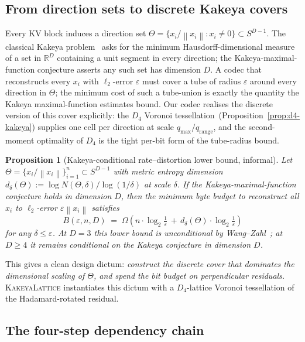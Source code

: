 \documentclass[11pt,a4paper]{article}
\theoremstyle{definition}
\theoremstyle{plain}
\newtheorem{proposition}[theorem]{Proposition}
\newcommand{\R}{\mathbb{R}}
\newcommand{\norm}[1]{\left\lVert#1\right\rVert}
\begin{document}
\subsection{From direction sets to discrete Kakeya covers}

Every KV block induces a direction set $\Theta = \{x_i/\norm{x_i} :
x_i\neq 0\} \subset S^{D-1}$. The classical Kakeya
problem~\cite{kakeya-problem,besicovitch-1919,besicovitch-1928}
asks for the minimum Hausdorff-dimensional measure of a set in
$\R^D$ containing a unit segment in every direction; the
Kakeya-maximal-function conjecture asserts any such set has
dimension $D$. A codec that reconstructs every $x_i$ with
$\ell_2$-error $\varepsilon$ must cover a tube of radius
$\varepsilon$ around every direction in $\Theta$; the minimum cost
of such a tube-union is exactly the quantity the Kakeya
maximal-function estimates bound. Our codec realises the discrete
version of this cover explicitly: the $D_4$ Voronoi
tessellation~(Proposition~\ref{prop:d4-kakeya}) supplies one cell
per direction at scale $q_\mathrm{max}/q_\mathrm{range}$, and the
second-moment optimality of $D_4$ is the tight per-bit form of the
tube-radius bound.

\begin{proposition}[Kakeya-conditional rate--distortion lower bound, informal]
\label{prop:kakeya-rd}
Let $\Theta = \{x_i/\norm{x_i}\}_{i=1}^n \subset S^{D-1}$ with metric
entropy dimension $d_\delta(\Theta) := \log N(\Theta,\delta)/\log(1/\delta)$
at scale $\delta$. If the Kakeya-maximal-function conjecture holds in
dimension $D$, then the minimum byte budget to reconstruct all $x_i$
to $\ell_2$-error $\varepsilon\norm{x_i}$ satisfies
\begin{equation}
B(\varepsilon,n,D) \;=\; \Omega\!\left(n\cdot\log_2\tfrac{1}{\varepsilon}\,+\,d_\delta(\Theta)\cdot\log_2\tfrac{1}{\varepsilon}\right)
\end{equation}
for any $\delta\leq\varepsilon$. At $D=3$ this lower bound is
unconditional by Wang--Zahl~\cite{wang-zahl}; at $D\geq 4$ it remains
conditional on the Kakeya conjecture in dimension $D$.
\end{proposition}

This gives a clean design dictum: \emph{construct the discrete
cover that dominates the dimensional scaling of $\Theta$, and
spend the bit budget on perpendicular residuals.}
\textsc{KakeyaLattice} instantiates this dictum with a
$D_4$-lattice Voronoi tessellation of the Hadamard-rotated
residual.

\subsection{The four-step dependency chain}
\label{sec:kbl-chain}
\end{document}
